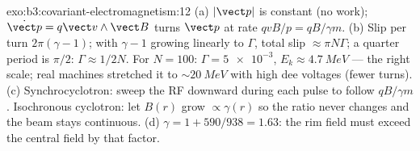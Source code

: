 \begin{solution}{exo:b3:covariant-electromagnetism:12}
(a) $|\vect p|$ is constant (no work); $\dot{\vect p} = q\vect
v\wedge\vect B$ turns $\vect p$ at rate $qvB/p = qB/\gamma m$. (b)
Slip per turn $2\pi(\gamma - 1)$; with $\gamma - 1$ growing linearly
to $\Gamma$, total slip $\approx \pi N\Gamma$; a quarter period is
$\pi/2$: $\Gamma \approx 1/2N$. For $N = 100$: $\Gamma =
\num{5e-3}$, $E_k \approx \qty{4.7}{MeV}$ --- the right scale; real
machines stretched it to $\sim\qty{20}{MeV}$ with high dee voltages
(fewer turns). (c) Synchrocyclotron: sweep the RF downward during
each pulse to follow $qB/\gamma m$. Isochronous cyclotron: let
$B(r)$ grow $\propto\gamma(r)$ so the ratio never changes and the
beam stays continuous. (d) $\gamma = 1 + 590/938 = 1.63$: the rim
field must exceed the central field by that factor.
\end{solution}

